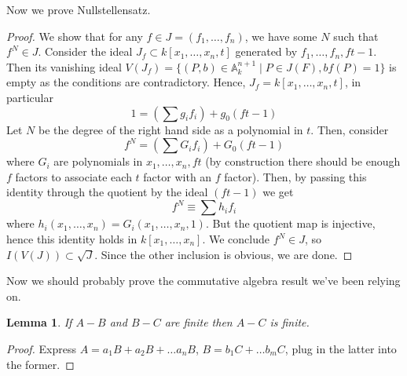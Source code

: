 \documentclass[12pt]{article}
\newcommand{\A}{\mathbb{A}}
\newtheorem{lemma}{Lemma}[section]
\begin{document}
    Now we prove Nullstellensatz. 
    \begin{proof}
        We show that for any $f \in J = (f_1, \dots, f_n)$, we have some $N$ such that $f^N \in J$. Consider the ideal $J_f \subset k[x_1, \dots, x_n, t]$ generated by $f_1, \dots, f_n, ft - 1$. Then its vanishing ideal $V(J_f) = \{(P, b) \in \A^{n+1}_k \mid P \in J(F), bf(P) = 1\}$ is empty as the conditions are contradictory. Hence, $J_f = k[x_1, \dots, x_n, t]$, in particular 
        $$1 = \left(\sum g_if_i\right) + g_{0}(ft - 1)$$
        Let $N$ be the degree of the right hand side as a polynomial in $t$. Then, consider 
        $$f^N = \left(\sum G_if_i \right) + G_0(ft - 1)$$
        where $G_i$ are polynomials in $x_1, \dots, x_n, ft$ (by construction there should be enough $f$ factors to associate each $t$ factor with an $f$ factor). Then, by passing this identity through the quotient by the ideal $(ft - 1)$ we get 
        $$f^N \equiv \sum h_i f_i$$
        where $h_i(x_1, \dots, x_n) = G_i(x_1, \dots, x_n, 1)$. But the quotient map is injective, hence this identity holds in $k[x_1, \dots, x_n]$. We conclude $f^N \in J$, so $I(V(J)) \subset \sqrt{J}$. Since the other inclusion is obvious, we are done.   
    \end{proof}
    Now we should probably prove the commutative algebra result we've been relying on. 
    \begin{lemma}
        If $A - B$ and $B - C$ are finite then $A - C$ is finite. 
    \end{lemma}
    \begin{proof}
        Express $A = a_1B + a_2B + \dots a_nB$, $B = b_1C + \dots b_mC$, plug in the latter into the former. 
    \end{proof}
\end{document}
